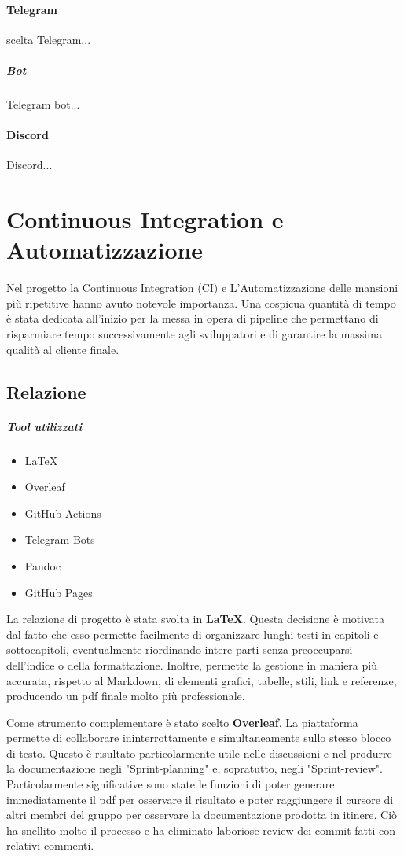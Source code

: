     \paragraph{Telegram}
    scelta Telegram...
        \subparagraph{Bot} 
        Telegram bot...
    
    \paragraph{Discord}
    Discord... 

\section{Continuous Integration e Automatizzazione}
\label{chap:CI}
Nel progetto la Continuous Integration (CI) e L'Automatizzazione delle mansioni più ripetitive hanno avuto notevole importanza. Una cospicua quantità di tempo è stata dedicata all'inizio per la messa in opera di pipeline che permettano di risparmiare tempo successivamente agli sviluppatori e di garantire la massima qualità al cliente finale.
    \subsection{Relazione}
        \subparagraph{Tool utilizzati}
        \begin{itemize}
            \item \LaTeX
            \item Overleaf
            \item GitHub Actions
            \item Telegram Bots
            \item Pandoc
            \item GitHub Pages
        \end{itemize}
        La relazione di progetto è stata svolta in \textbf{\LaTeX}. Questa decisione è motivata dal fatto che esso permette facilmente di organizzare lunghi testi in capitoli e sottocapitoli, eventualmente riordinando intere parti senza preoccuparsi dell'indice o della formattazione. Inoltre, permette la gestione in maniera più accurata, rispetto al Markdown, di elementi grafici, tabelle, stili, link e referenze, producendo un pdf finale molto più professionale. 
        
        Come strumento complementare è stato scelto \textbf{Overleaf}. La piattaforma permette di collaborare ininterrottamente e simultaneamente sullo stesso blocco di testo. Questo è risultato particolarmente utile nelle discussioni e nel produrre la documentazione negli "Sprint-planning" e, sopratutto, negli "Sprint-review". Particolarmente significative sono state le funzioni di poter generare immediatamente il pdf per osservare il risultato e poter raggiungere il cursore di altri membri del gruppo per osservare la documentazione prodotta in itinere. Ciò ha snellito molto il processo e ha eliminato laboriose review dei commit fatti con relativi commenti.  

